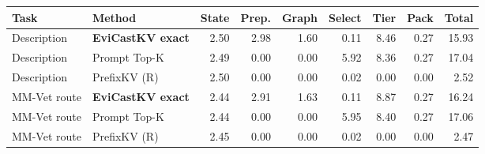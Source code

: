 \begin{tabular}{llrrrrrrr}
\toprule
Task & Method & State & Prep. & Graph & Select & Tier & Pack & Total\\\midrule
Description & \textbf{EviCastKV exact} & 2.50 & 2.98 & 1.60 & 0.11 & 8.46 & 0.27 & 15.93\\
Description & Prompt Top-K & 2.49 & 0.00 & 0.00 & 5.92 & 8.36 & 0.27 & 17.04\\
Description & PrefixKV (R) & 2.50 & 0.00 & 0.00 & 0.02 & 0.00 & 0.00 & 2.52\\
MM-Vet route & \textbf{EviCastKV exact} & 2.44 & 2.91 & 1.63 & 0.11 & 8.87 & 0.27 & 16.24\\
MM-Vet route & Prompt Top-K & 2.44 & 0.00 & 0.00 & 5.95 & 8.40 & 0.27 & 17.06\\
MM-Vet route & PrefixKV (R) & 2.45 & 0.00 & 0.00 & 0.02 & 0.00 & 0.00 & 2.47\\
\bottomrule
\end{tabular}
